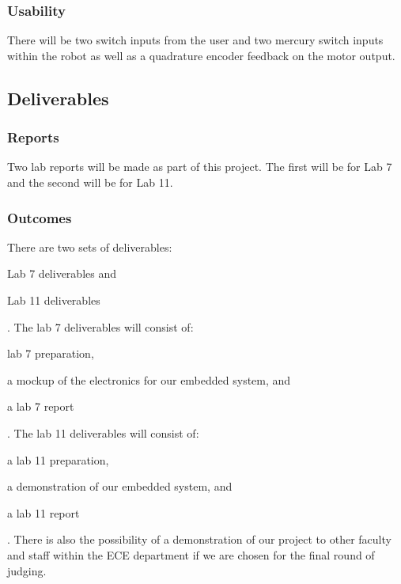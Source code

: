 \documentclass{article}
\begin{document}
		\subsubsection{Usability}
			There will be two switch inputs from the user and two mercury switch inputs within the robot as well as a quadrature encoder feedback on the motor output.
		
	\subsection{Deliverables}

		\subsubsection{Reports}
			Two lab reports will be made as part of this project. The first will be for Lab 7 and the second will be for Lab 11.
	
		\subsubsection{Outcomes}
			There are two sets of deliverables:
		\begin{inlinelist}
			\item Lab 7 deliverables and
			\item Lab 11 deliverables
		\end{inlinelist}.
		The lab 7 deliverables will consist of:
		\begin{inlinelist}
			\item lab 7 preparation,
			\item a mockup of the electronics for our embedded system, and
			\item a lab 7 report
		\end{inlinelist}.
		The lab 11 deliverables will consist of:
		\begin{inlinelist}
			\item a lab 11 preparation,
			\item a demonstration of our embedded system, and
			\item a lab 11 report
		\end{inlinelist}. There is also the possibility of a demonstration of our project to other faculty and staff within the ECE department if we are chosen for the final round of judging.

 
\end{document}

